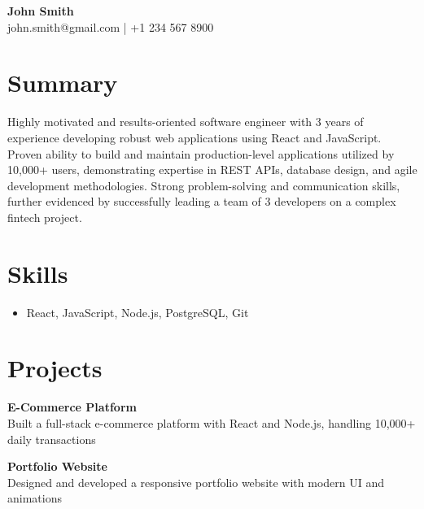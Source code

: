 \documentclass[11pt,a4paper]{article}
\begin{document}
\begin{center}
    {\LARGE \textbf{\textcolor{accent}{ John Smith }}}\\
    \vspace{0.2cm}
    john.smith@gmail.com | +1 234 567 8900
\end{center}
\section*{Summary}
Highly motivated and results-oriented software engineer with 3 years of experience developing robust web applications using React and JavaScript. Proven ability to build and maintain production-level applications utilized by 10,000+ users, demonstrating expertise in REST APIs, database design, and agile development methodologies. Strong problem-solving and communication skills, further evidenced by successfully leading a team of 3 developers on a complex fintech project.
\section*{Skills}

\begin{itemize}[leftmargin=*]
    \item React, JavaScript, Node.js, PostgreSQL, Git
\end{itemize}

\section*{Projects}

\textbf{\textcolor{accent}{ E-Commerce Platform }}\\
Built a full-stack e-commerce platform with React and Node.js, handling 10,000+ daily transactions
\vspace{0.3cm}

\textbf{\textcolor{accent}{ Portfolio Website }}\\
Designed and developed a responsive portfolio website with modern UI and animations
\end{document}
